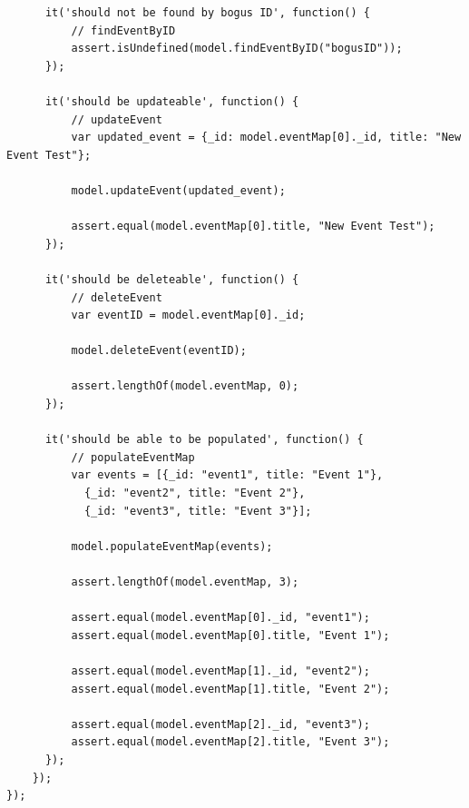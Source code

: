 \documentclass[12pt]{ucthesis}
\begin{document}
\begin{lstlisting}
      it('should not be found by bogus ID', function() {
          // findEventByID
          assert.isUndefined(model.findEventByID("bogusID")); 
      });

      it('should be updateable', function() {
          // updateEvent
          var updated_event = {_id: model.eventMap[0]._id, title: "New Event Test"};

          model.updateEvent(updated_event);

          assert.equal(model.eventMap[0].title, "New Event Test");
      });

      it('should be deleteable', function() {
          // deleteEvent
          var eventID = model.eventMap[0]._id;

          model.deleteEvent(eventID);

          assert.lengthOf(model.eventMap, 0);
      });

      it('should be able to be populated', function() {
          // populateEventMap
          var events = [{_id: "event1", title: "Event 1"}, 
            {_id: "event2", title: "Event 2"}, 
            {_id: "event3", title: "Event 3"}];

          model.populateEventMap(events);

          assert.lengthOf(model.eventMap, 3);

          assert.equal(model.eventMap[0]._id, "event1");
          assert.equal(model.eventMap[0].title, "Event 1");

          assert.equal(model.eventMap[1]._id, "event2");
          assert.equal(model.eventMap[1].title, "Event 2");

          assert.equal(model.eventMap[2]._id, "event3");
          assert.equal(model.eventMap[2].title, "Event 3");
      });
    });
});
\end{lstlisting}
\end{document}
